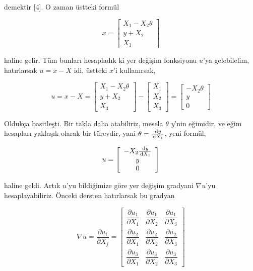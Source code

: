 \documentclass[12pt,fleqn]{article}\usepackage{../../common}
\begin{document}
demektir [4]. O zaman üstteki formül

$$
x = \left[\begin{array}{c}
X_1 - X_2 \theta \\ y + X_2 \\ X_3
\end{array}\right]
$$

haline gelir. Tüm bunları hesapladık ki yer değişim fonksiyonu $u$'ya
gelebilelim, hatırlarsak $u = x - X$ idi, üstteki $x$'i kullanırsak,

$$
u = x - X =
\left[\begin{array}{c}
X_1 - X_2 \theta \\ y + X_2 \\ X_3
\end{array}\right] -
\left[\begin{array}{ccc}
X_1 \\ X_2 \\ X_3
\end{array}\right] =
\left[\begin{array}{ccc}
-X_2 \theta \\ y \\ 0
\end{array}\right] 
$$

Oldukça basitleşti. Bir takla daha atabiliriz, mesela $\theta$ $y$'nin eğimidir,
ve eğim hesapları yaklaşık olarak bir türevdir, yani $\theta = \frac{\,\mathrm{d} y}{\,\mathrm{d} X_1}$,
yeni formül,

$$
u = \left[\begin{array}{ccc}
-X_2 \frac{\,\mathrm{d} y}{\,\mathrm{d} X_1} \\ y \\ 0
\end{array}\right]
$$

haline geldi. Artık $u$'yu bildiğimize göre yer değişim gradyani $\nabla u$'yu
hesaplayabiliriz. Önceki dersten hatırlarsak bu gradyan

$$
\renewcommand*{\arraystretch}{2.5}
\nabla u = \frac{\partial u_i}{\partial X_j} =
\left[\begin{array}{ccc}
\dfrac{\partial u_1}{\partial X_1} & \dfrac{\partial u_1}{\partial X_2} & \dfrac{\partial u_1}{\partial X_3} \\
\dfrac{\partial u_2}{\partial X_1} & \dfrac{\partial u_2}{\partial X_2} & \dfrac{\partial u_2}{\partial X_3} \\
\dfrac{\partial u_3}{\partial X_1} & \dfrac{\partial u_3}{\partial X_2} & \dfrac{\partial u_3}{\partial X_3} 
\end{array}\right]
$$
\end{document}
